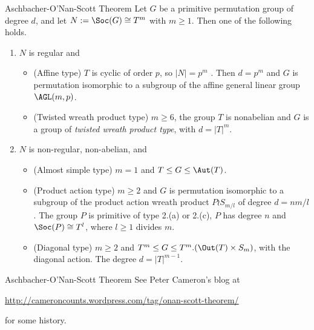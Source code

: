 \begin{frame}[fragile,label=OSTheorem]{Aschbacher-O'Nan-Scott Theorem}
Let $G$ be a primitive permutation
group of degree $d$, and let $N := \Soc(G) \cong T^m$ with $m \geq 1$. 
Then one of the following holds.
\vskip2mm
\begin{enumerate}
\item 
$N$ is regular and
  \begin{itemize}
  \item 
  \alert{(Affine type)} $T$ is cyclic of order $p$, so $|N| = p^m$ . Then 
$d = p^m$ and $G$ is permutation isomorphic to a subgroup of the affine
general linear group $\AGL(m,p)$.
\vskip2mm
\item \alert{(Twisted wreath product type)} $m \geq 6$, the group $T$ is 
  nonabelian and $G$ is a group of \emph{twisted wreath product type}, with
  $d = |T|^m$.
  \end{itemize}
\vskip2mm
\item $N$ is non-regular, non-abelian, and
  \begin{itemize}
  \item 
\alert{(Almost simple type)} $m = 1$ and $T \leq G \leq \Aut(T)$.
\vskip2mm
\item \alert{(Product action type)} $m \geq 2$ and $G$ is permutation isomorphic to a
subgroup of the product action wreath product $P \wr S_{m/l}$ of degree
$d = nm/l$. The group $P$ is primitive of type 2.(a) or 2.(c), $P$ has
degree $n$ and $\Soc(P) \cong T^l$, where $l \geq 1$ divides $m$.
\vskip2mm
\item 
\alert{(Diagonal type)} $m \geq 2$ and $T^m \leq G \leq T^m . (\Out(T ) \times S_m)$, with
the diagonal action. The degree $d = |T|^{m-1}$.
  \end{itemize}
\end{enumerate}
\end{frame}

\begin{frame}[fragile,label=OSTheorem]{Aschbacher-O'Nan-Scott Theorem}
See Peter Cameron's blog at 
\begin{center}
{\small  \url{http://cameroncounts.wordpress.com/tag/onan-scott-theorem/}}
\end{center}
 for some history.
\end{frame}





